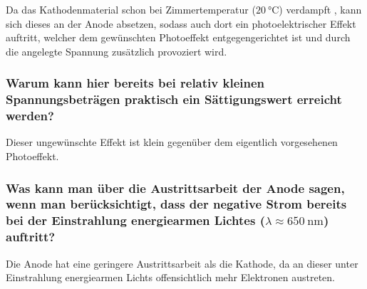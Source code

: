 
Da das Kathodenmaterial schon bei Zimmertemperatur ($\SI{20}{\celsius}$) verdampft \cite{versuchsanleitung},
kann sich dieses an der Anode absetzen,
sodass auch dort ein photoelektrischer Effekt auftritt,
welcher dem gewünschten Photoeffekt entgegengerichtet ist
und durch die angelegte Spannung zusätzlich provoziert wird.

\subsubsection*{Warum kann hier bereits bei relativ kleinen Spannungsbeträgen praktisch ein Sättigungswert erreicht werden?}

Dieser ungewünschte Effekt ist klein gegenüber dem eigentlich vorgesehenen Photoeffekt.

\subsubsection*{Was kann man über die Austrittsarbeit der Anode sagen, wenn man berücksichtigt,
dass der negative Strom bereits bei der Einstrahlung energiearmen Lichtes ($\lambda \approx \SI{650}{\nano\meter}$) auftritt?}

Die Anode hat eine geringere Austrittsarbeit als die Kathode,
da an dieser unter Einstrahlung energiearmen Lichts offensichtlich mehr Elektronen austreten.
